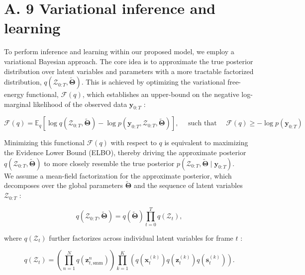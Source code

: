 \documentclass[10pt]{article}
\begin{document}
\section*{A. 9 Variational inference and learning}
To perform inference and learning within our proposed model, we employ a variational Bayesian approach. The core idea is to approximate the true posterior distribution over latent variables and parameters with a more tractable factorized distribution, $q\left(\mathcal{Z}_{0: T}, \tilde{\boldsymbol{\Theta}}\right)$. This is achieved by optimizing the variational free-energy functional, $\mathcal{F}(q)$, which establishes an upper-bound on the negative log-marginal likelihood of the observed data $\mathbf{y}_{0: T}$ :


\begin{equation*}
\mathcal{F}(q)=\mathbb{E}_{q}\left[\log q\left(\mathcal{Z}_{0: T}, \tilde{\mathbf{\Theta}}\right)-\log p\left(\mathbf{y}_{0: T}, \mathcal{Z}_{0: T}, \tilde{\mathbf{\Theta}}\right)\right], \quad \text { such that } \quad \mathcal{F}(q) \geq-\log p\left(\mathbf{y}_{0: T}\right) \tag{33}
\end{equation*}


Minimizing this functional $\mathcal{F}(q)$ with respect to $q$ is equivalent to maximizing the Evidence Lower Bound (ELBO), thereby driving the approximate posterior $q\left(\mathcal{Z}_{0: T}, \tilde{\boldsymbol{\Theta}}\right)$ to more closely resemble the true posterior $p\left(\mathcal{Z}_{0: T}, \tilde{\boldsymbol{\Theta}} \mid \mathbf{y}_{0: T}\right)$.\\
We assume a mean-field factorization for the approximate posterior, which decomposes over the global parameters $\tilde{\boldsymbol{\Theta}}$ and the sequence of latent variables $\mathcal{Z}_{0: T}$ :


\begin{equation*}
q\left(\mathcal{Z}_{0: T}, \tilde{\boldsymbol{\Theta}}\right)=q(\tilde{\boldsymbol{\Theta}}) \prod_{t=0}^{T} q\left(\mathcal{Z}_{t}\right), \tag{34}
\end{equation*}


where $q\left(\mathcal{Z}_{t}\right)$ further factorizes across individual latent variables for frame $t$ :


\begin{equation*}
q\left(\mathcal{Z}_{t}\right)=\left(\prod_{n=1}^{N} q\left(\mathbf{z}_{t, \mathrm{smm}}^{n}\right)\right) \prod_{k=1}^{K}\left(q\left(\mathbf{x}_{t}^{(k)}\right) q\left(\mathbf{z}_{t}^{(k)}\right) q\left(\mathbf{s}_{t}^{(k)}\right)\right) . \tag{35}
\end{equation*}
\end{document}
